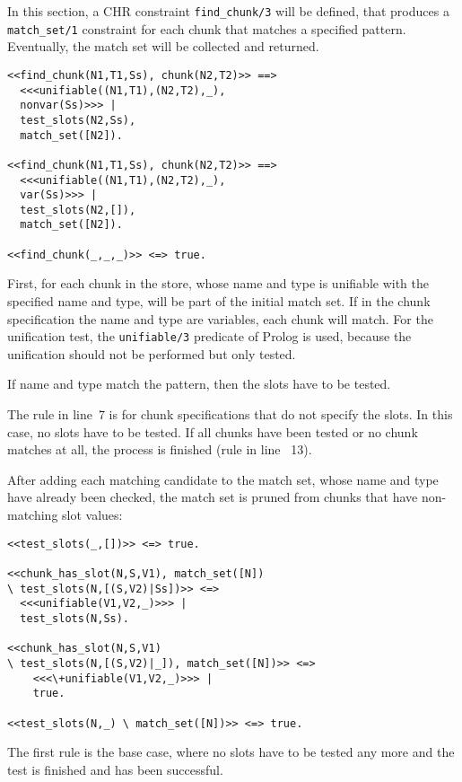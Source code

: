 In this section, a CHR constraint \lstinline|find_chunk/3| will be defined, that produces a \lstinline|match_set/1| constraint for each chunk that matches a specified pattern. Eventually, the match set will be collected and returned.

\begin{lstlisting}
<<find_chunk(N1,T1,Ss), chunk(N2,T2)>> ==> 
  <<<unifiable((N1,T1),(N2,T2),_), 
  nonvar(Ss)>>> | 
  test_slots(N2,Ss), 
  match_set([N2]).
  
<<find_chunk(N1,T1,Ss), chunk(N2,T2)>> ==> 
  <<<unifiable((N1,T1),(N2,T2),_), 
  var(Ss)>>> | 
  test_slots(N2,[]), 
  match_set([N2]).

<<find_chunk(_,_,_)>> <=> true.
\end{lstlisting}

First, for each chunk in the store, whose name and type is unifiable with the specified name and type, will be part of the initial match set. If in the chunk specification the name and type are variables, each chunk will match. For the unification test, the \lstinline|unifiable/3| predicate of Prolog is used, because the unification should not be performed but only tested. 

If name and type match the pattern, then the slots have to be tested.

The rule in line~7 is for chunk specifications that do not specify the slots. In this case, no slots have to be tested. If all chunks have been tested or no chunk matches at all, the process is finished (rule in line ~13).

After adding each matching candidate to the match set, whose name and type have already been checked, the match set is pruned from chunks that have non-matching slot values:

\begin{lstlisting}
<<test_slots(_,[])>> <=> true.

<<chunk_has_slot(N,S,V1), match_set([N]) 
\ test_slots(N,[(S,V2)|Ss])>> <=> 
  <<<unifiable(V1,V2,_)>>> | 
  test_slots(N,Ss).

<<chunk_has_slot(N,S,V1) 
\ test_slots(N,[(S,V2)|_]), match_set([N])>> <=> 
    <<<\+unifiable(V1,V2,_)>>> | 
    true.

<<test_slots(N,_) \ match_set([N])>> <=> true.
\end{lstlisting}

The first rule is the base case, where no slots have to be tested any more and the test is finished and has been successful.

